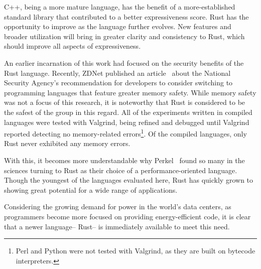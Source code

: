 C++, being a more mature language, has the benefit of a more-established standard library that contributed to a better expressiveness score. Rust has the opportunity to improve as the language further evolves. New features and broader utilization will bring in greater clarity and consistency to Rust, which should improve all aspects of expressiveness. 

An earlier incarnation of this work had focused on the security benefits of the Rust language. Recently, ZDNet published an article~\cite{tung} about the National Security Agency's recommendation for developers to consider switching to programming languages that feature greater memory safety. While memory safety was not a focus of this research, it is noteworthy that Rust is considered to be the safest of the group in this regard. All of the experiments written in compiled languages were tested with Valgrind, being refined and debugged until Valgrind reported detecting no memory-related errors\footnote{Perl and Python were not tested with Valgrind, as they are built on bytecode interpreters.}. Of the compiled languages, only Rust never exhibited any memory errors.

With this, it becomes more understandable why Perkel~\cite{nature} found so many in the sciences turning to Rust as their choice of a performance-oriented language. Though the youngest of the languages evaluated here, Rust has quickly grown to showing great potential for a wide range of applications.

Considering the growing demand for power in the world's data centers, as programmers become more focused on providing energy-efficient code, it is clear that a newer language-- Rust-- is immediately available to meet this need.
